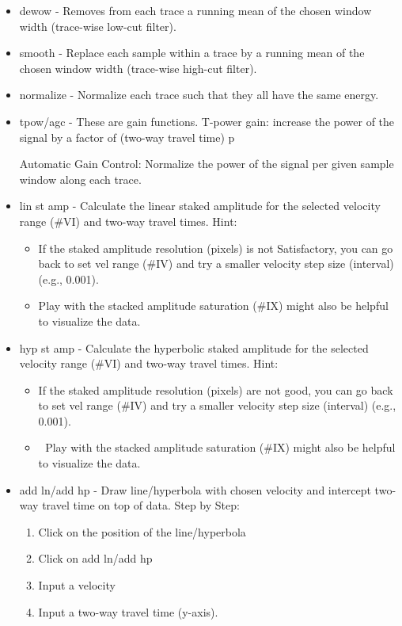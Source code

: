 \documentclass[12pt]{article}
\begin{document}
\begin{itemize}
    \item dewow - Removes from each trace a running mean of the chosen window width (trace-wise low-cut filter). 

    \item smooth - Replace each sample within a trace by a running mean of the chosen window width (trace-wise high-cut filter).
  
    \item normalize - Normalize each trace such that they all have the same energy. 

    \item tpow/agc - These are gain functions. 
     T-power gain: increase the power of the signal by a factor of (two-way travel time) p
     
Automatic Gain Control: Normalize the power of the signal per given sample window along each trace.


    \item lin st amp - Calculate the linear staked amplitude for the selected velocity range (\#VI) and two-way travel times.
Hint:
\begin{itemize}
    \item If the staked amplitude resolution (pixels) is not Satisfactory, you can go back to set vel range (\#IV) and try a smaller velocity step size (interval) (e.g., 0.001). 
    \item Play with the stacked amplitude saturation (\#IX) might also be helpful to visualize the data.
\end{itemize}
 
    \item hyp st amp - Calculate the hyperbolic staked amplitude for the selected velocity range (\#VI) and two-way travel times.
Hint:
\begin{itemize}
    \item If the staked amplitude resolution (pixels) are not good, you can go back to set vel range (\#IV) and try a smaller velocity step size (interval) (e.g., 0.001). 
    \item 	Play with the stacked amplitude saturation (\#IX) might also be helpful to visualize the data.
\end{itemize}

    \item add ln/add hp - Draw line/hyperbola with chosen velocity and intercept two-way travel time on top of data.
Step by Step:
\begin{enumerate}
    \item Click on the position of the line/hyperbola
    \item Click on add ln/add hp
    \item Input a velocity
    \item Input a two-way travel time (y-axis).
\end{enumerate}
  

\end{itemize}
\end{document}
